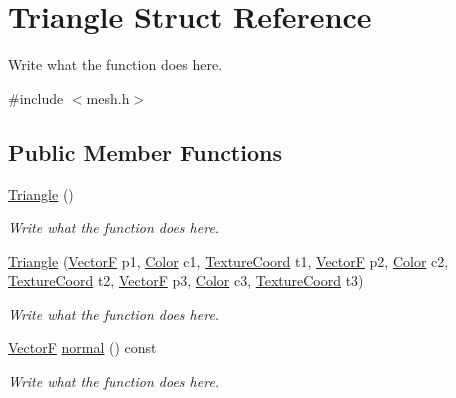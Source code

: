 \hypertarget{structTriangle}{\section{Triangle Struct Reference}
\label{structTriangle}
}


Write what the function does here.  




{\ttfamily \#include $<$mesh.\+h$>$}

\subsection*{Public Member Functions}
\begin{DoxyCompactItemize}
\item 
\hyperlink{structTriangle_aaefe4ed500c07918d30c6f0e286332c5}{Triangle} ()
\begin{DoxyCompactList}\small\item\em Write what the function does here. \end{DoxyCompactList}\item 
\hyperlink{structTriangle_a9a52ea935ddd91cf0b939f494e4a6a81}{Triangle} (\hyperlink{structVectorF}{Vector\+F} p1, \hyperlink{structColor}{Color} c1, \hyperlink{structTextureCoord}{Texture\+Coord} t1, \hyperlink{structVectorF}{Vector\+F} p2, \hyperlink{structColor}{Color} c2, \hyperlink{structTextureCoord}{Texture\+Coord} t2, \hyperlink{structVectorF}{Vector\+F} p3, \hyperlink{structColor}{Color} c3, \hyperlink{structTextureCoord}{Texture\+Coord} t3)
\begin{DoxyCompactList}\small\item\em Write what the function does here. \end{DoxyCompactList}\item 
\hyperlink{structVectorF}{Vector\+F} \hyperlink{structTriangle_aba3ae2681927a25f27972819cbdc474d}{normal} () const 
\begin{DoxyCompactList}\small\item\em Write what the function does here. \end{DoxyCompactList}\end{DoxyCompactItemize}
